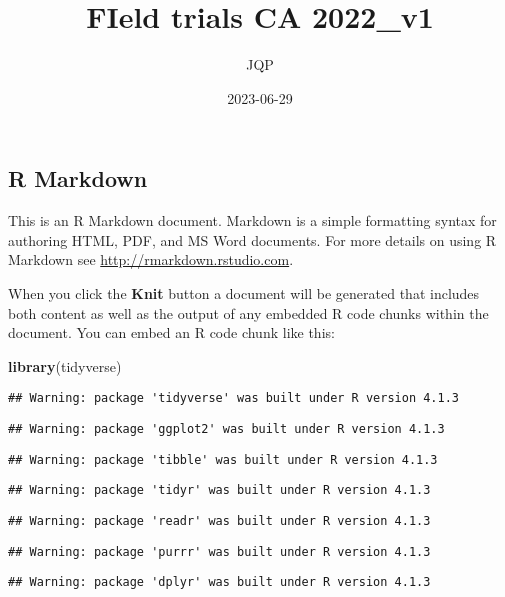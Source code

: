 \documentclass[
]{article}
\title{FIeld trials CA 2022\_v1}
\author{JQP}
\date{2023-06-29}
\newenvironment{Shaded}{\begin{snugshade}}{\end{snugshade}}
\newcommand{\FunctionTok}[1]{\textcolor[rgb]{0.13,0.29,0.53}{\textbf{#1}}}
\newcommand{\NormalTok}[1]{#1}
\begin{document}
\maketitle

\hypertarget{r-markdown}{%
\subsection{R Markdown}\label{r-markdown}}

This is an R Markdown document. Markdown is a simple formatting syntax
for authoring HTML, PDF, and MS Word documents. For more details on
using R Markdown see \url{http://rmarkdown.rstudio.com}.

When you click the \textbf{Knit} button a document will be generated
that includes both content as well as the output of any embedded R code
chunks within the document. You can embed an R code chunk like this:

\begin{Shaded}
\begin{Highlighting}[]
\FunctionTok{library}\NormalTok{(tidyverse)}
\end{Highlighting}
\end{Shaded}

\begin{verbatim}
## Warning: package 'tidyverse' was built under R version 4.1.3
\end{verbatim}

\begin{verbatim}
## Warning: package 'ggplot2' was built under R version 4.1.3
\end{verbatim}

\begin{verbatim}
## Warning: package 'tibble' was built under R version 4.1.3
\end{verbatim}

\begin{verbatim}
## Warning: package 'tidyr' was built under R version 4.1.3
\end{verbatim}

\begin{verbatim}
## Warning: package 'readr' was built under R version 4.1.3
\end{verbatim}

\begin{verbatim}
## Warning: package 'purrr' was built under R version 4.1.3
\end{verbatim}

\begin{verbatim}
## Warning: package 'dplyr' was built under R version 4.1.3
\end{verbatim}
\end{document}
